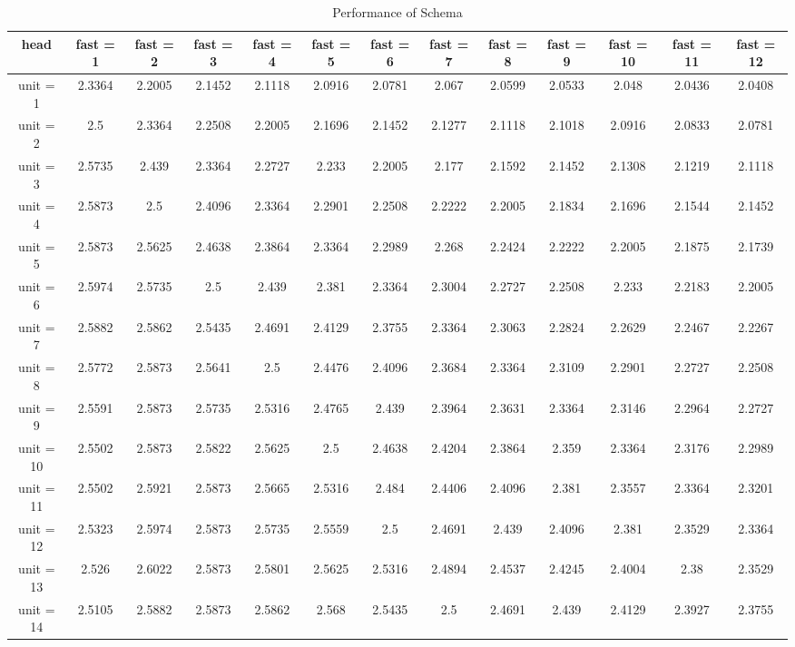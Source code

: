 \begin{table*}[ht]
\tabcolsep=0.11cm
\tiny
\caption{Performance of Schema} 
\label{performance-table}
\begin{tabular}{|c|c|c|c|c|c|c|c|c|c|c|c|c|}
\hline
head &  fast = 1 & fast = 2 & fast = 3 & fast = 4 & fast = 5 & fast = 6 & fast = 7 & fast = 8 & fast = 9 & fast = 10 & fast = 11 & fast = 12 \\ \hline
unit = 1 &
2.3364 & 2.2005 & 2.1452 & 2.1118 & 2.0916 & 2.0781 & 2.067 & 2.0599 & 2.0533 & 2.048 & 2.0436 & 2.0408 \\
\hline
unit = 2 &
2.5 & 2.3364 & 2.2508 & 2.2005 & 2.1696 & 2.1452 & 2.1277 & 2.1118 & 2.1018 & 2.0916 & 2.0833 & 2.0781 \\
\hline
unit = 3 &
2.5735 & 2.439 & 2.3364 & 2.2727 & 2.233 & 2.2005 & 2.177 & 2.1592 & 2.1452 & 2.1308 & 2.1219 & 2.1118 \\
\hline
unit = 4 &
2.5873 & 2.5 & 2.4096 & 2.3364 & 2.2901 & 2.2508 & 2.2222 & 2.2005 & 2.1834 & 2.1696 & 2.1544 & 2.1452 \\
\hline
unit = 5 &
2.5873 & 2.5625 & 2.4638 & 2.3864 & 2.3364 & 2.2989 & 2.268 & 2.2424 & 2.2222 & 2.2005 & 2.1875 & 2.1739 \\
\hline
unit = 6 &
2.5974 & 2.5735 & 2.5 & 2.439 & 2.381 & 2.3364 & 2.3004 & 2.2727 & 2.2508 & 2.233 & 2.2183 & 2.2005 \\
\hline
unit = 7 &
2.5882 & 2.5862 & 2.5435 & 2.4691 & 2.4129 & 2.3755 & 2.3364 & 2.3063 & 2.2824 & 2.2629 & 2.2467 & 2.2267 \\
\hline
unit = 8 &
2.5772 & 2.5873 & 2.5641 & 2.5 & 2.4476 & 2.4096 & 2.3684 & 2.3364 & 2.3109 & 2.2901 & 2.2727 & 2.2508 \\
\hline
unit = 9 &
2.5591 & 2.5873 & 2.5735 & 2.5316 & 2.4765 & 2.439 & 2.3964 & 2.3631 & 2.3364 & 2.3146 & 2.2964 & 2.2727 \\
\hline
unit = 10 &
2.5502 & 2.5873 & 2.5822 & 2.5625 & 2.5 & 2.4638 & 2.4204 & 2.3864 & 2.359 & 2.3364 & 2.3176 & 2.2989 \\
\hline
unit = 11 &
2.5502 & 2.5921 & 2.5873 & 2.5665 & 2.5316 & 2.484 & 2.4406 & 2.4096 & 2.381 & 2.3557 & 2.3364 & 2.3201 \\
\hline
unit = 12 &
2.5323 & 2.5974 & 2.5873 & 2.5735 & 2.5559 & 2.5 & 2.4691 & 2.439 & 2.4096 & 2.381 & 2.3529 & 2.3364 \\
\hline
unit = 13 &
2.526 & 2.6022 & 2.5873 & 2.5801 & 2.5625 & 2.5316 & 2.4894 & 2.4537 & 2.4245 & 2.4004 & 2.38 & 2.3529 \\
\hline
unit = 14 &
2.5105 & 2.5882 & 2.5873 & 2.5862 & 2.568 & 2.5435 & 2.5 & 2.4691 & 2.439 & 2.4129 & 2.3927 & 2.3755 \\

\end{tabular}
\end{table*}
